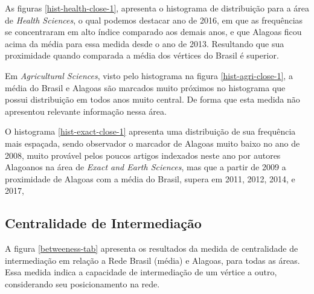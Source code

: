 As figuras \ref{hist-health-close-1}, apresenta o histograma de distribuição para a área de \textit{Health Sciences}, o qual podemos destacar ano de 2016, em que as frequências se concentraram em alto índice comparado aos demais anos, e que Alagoas ficou acima da média para essa medida desde o ano de 2013. Resultando que sua proximidade quando comparada a média dos vértices do Brasil é superior.

Em \textit{Agricultural Sciences}, visto pelo histograma na figura \ref{hist-agri-close-1}, a média do Brasil e Alagoas são marcados muito próximos no histograma que possui distribuição em todos anos muito central. De forma que esta medida não apresentou relevante informação nessa área.

O histograma \ref{hist-exact-close-1} apresenta uma distribuição de sua frequência mais espaçada, sendo observador o marcador de Alagoas muito baixo no ano de 2008, muito provável pelos poucos artigos indexados neste ano por autores Alagoanos na área de \textit{Exact and Earth Sciences}, mas que a partir de 2009 a proximidade de Alagoas com a média do Brasil, supera em 2011, 2012, 2014, e 2017,



\subsection{\textbf{Centralidade de Intermediação}}

A figura \ref{betweeness-tab} apresenta os resultados da medida de centralidade de intermediação em relação a Rede Brasil (média) e Alagoas, para todas as áreas. Essa medida indica a capacidade de intermediação de um vértice a outro, considerando seu posicionamento na rede.

